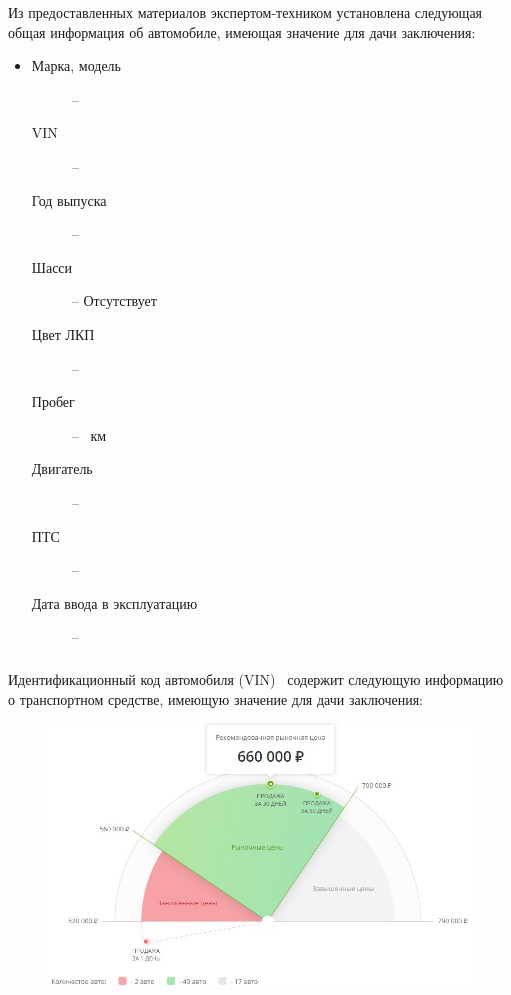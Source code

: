  \par Из предоставленных материалов   экспертом-техником установлена следующая общая информация об автомобиле, имеющая значение для дачи заключения:\\
 \parbox[]{10cm}{}
	\begin{itemize}
		\item[ ] 
			\begin{description}
			\item[Марка, модель] -- 
			\item[VIN] -- \vin
			\item[Год выпуска] -- 
			\item[Шасси] -- Отсутствует
			\item[Цвет ЛКП] -- 
			\item[Пробег] --  \, км%
			\item[Двигатель] -- 
	    	\item[ПТС] --	
	    	\item[Дата ввода в эксплуатацию] --
		\end{description}
		\end{itemize}
	\subparagraph*{} Идентификационный код автомобиля (VIN)  \vin \, содержит следующую информацию о транспортном средстве, имеющую значение для 	дачи заключения:\\
  \begin{figure}[!h]
	\centering
	\includegraphics[width=0.98\linewidth]{images/1}
	\caption{{\footnotesize {}}}
\end{figure}
    
